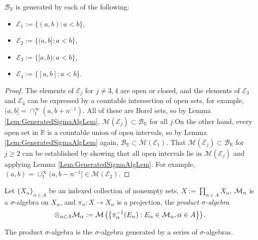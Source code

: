 \begin{exc}
    \label{Exer:BRGeneratedsets}
    $\mathcal{B}_{\mathbb{R}}$ is generated by each of the following:
    \begin{itemize}
        \item $\mathcal{E}_{1}:=\{(a,b):a<b\}$,
        \item $\mathcal{E}_{2}:=\{(a,b]:a<b\}$,
        \item $\mathcal{E}_{3}:=\{[a,b):a<b\}$,
        \item $\mathcal{E}_{4}:=\{[a,b]:a<b\}$.
    \end{itemize}
\end{exc}
\begin{proof}
    The elements of $\mathcal{E}_{j}$ for $j\neq3,4$ are open or closed,
    and the elements of $\mathcal{E}_{3}$ and $\mathcal{E}_{4}$ can be expressed
    by a countable intersection of open sets, for example, $(a,b]=\cap_{1}^{\infty}(a,b+n^{-1})$.
    All of these are Borel sets, so by Lemma \ref{Lem:GeneratedSigmaAlgLem},
    $\mathcal{M}(\mathcal{E}_{j})\subset\mathcal{B}_{\mathbb{R}}$ for all $j$.On the other hand,
    every open set in $\mathbb{R}$ is a countable union of open intervals,
    so by Lemma \ref{Lem:GeneratedSigmaAlgLem} again, $\mathcal{B}_{\mathbb{R}}\subset\mathcal{M}(\mathcal{E}_{1})$. 
    That $\mathcal{M}(\mathcal{E}_{j})\subset\mathcal{B}_{\mathbb{R}}$ for $j\geq2$ can be established
    by showing that all open intervals lie in $\mathcal{M}(\mathcal{E}_{j})$ and applying Lemma \ref{Lem:GeneratedSigmaAlgLem}.
    For example, $(a,b)=\cup_{1}^{\infty}(a,b-n^{-1}]\in\mathcal{M}(\mathcal{E}_{2})$.
\end{proof}
\begin{defn}
    \label{Defn:ProdSigmaAlg}
    Let $\{X_{\alpha}\}_{\alpha\in A}$ be an indexed collection 
    of nonempty sets, $X:=\prod_{\alpha\in A}X_{\alpha}$, 
    $\mathcal{M}_{\alpha}$ is a $\sigma$-algebra on $X_{\alpha}$, 
    and $\pi_{\alpha}:X\rightarrow X_{\alpha}$ is a projection, 
    the \textit{product $\sigma$-algebra} 
    \begin{displaymath}
        \otimes_{\alpha\in A}\mathcal{M}_{\alpha}:=\mathcal{M}\left(
            \left\{\pi_{\alpha}^{-1}(E_{\alpha}):
            E_{\alpha}\in\mathcal{M}_{\alpha},\alpha\in A\right\}
        \right).
    \end{displaymath}
\end{defn}
\begin{rem}
    The product $\sigma$-algebra is the 
    $\sigma$-algebra generated by a series of 
    $\sigma$-algebras.
\end{rem}
